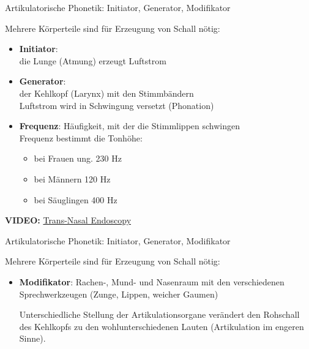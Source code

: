 \begin{frame}{Artikulatorische Phonetik: Initiator, Generator, Modifikator}

Mehrere Körperteile sind für Erzeugung von Schall nötig:
		
\begin{itemize}
	\item \textbf{Initiator}:\\
	die Lunge \ras (Atmung) erzeugt Luftstrom
	
	\item \textbf{Generator}:\\
	der Kehlkopf (Larynx) mit den Stimmbändern \ras\\
	Luftstrom wird in Schwingung versetzt (Phonation)

	\item \textbf{Frequenz}: Häufigkeit, mit der die Stimmlippen schwingen\\
	\medskip
	Frequenz bestimmt die Tonhöhe:
	
	\begin{itemize}
		\item bei Frauen ung. 230 Hz
		\item bei Männern 120 Hz 
		\item bei Säuglingen 400 Hz
	\end{itemize}

\end{itemize}

\textbf{VIDEO:} \href{run:material/04TransNasalEndoscopy.mp4}{Trans-Nasal Endoscopy}


\end{frame}


\begin{frame}{Artikulatorische Phonetik: Initiator, Generator, Modifikator}

Mehrere Körperteile sind für Erzeugung von Schall nötig:

\begin{itemize}
	\item \textbf{Modifikator}: Rachen-, Mund- und Nasenraum mit den verschiedenen Sprechwerkzeugen (Zunge, Lippen, weicher Gaumen)

\medskip
	
	Unterschiedliche Stellung der Artikulationsorgane verändert den Rohschall des Kehlkopfs zu den wohlunterschiedenen Lauten (Artikulation im engeren Sinne).
\end{itemize}
	
\end{frame}


